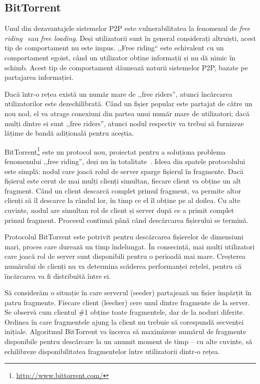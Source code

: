 \subsection{BitTorrent}

Unul din dezavantajele sistemelor P2P este vulnerabilitatea la  fenomenul de
\textit{free riding}~\cite{free-riding} sau \textit{free loading}.
Deși utilizatorii sunt în general considerați altruiști, acest tip de
comportament nu este impus. ,,Free riding`` este echivalent cu un comportament
egoist, când un utilizator obține informații și nu dă nimic în schimb. Acest
tip de comportament dăunează naturii sistemelor P2P, bazate pe partajarea
informației.

Dacă într-o rețea există un număr mare de ,,free riders'', atunci încărcarea
utilizatorilor este dezechilibrată. Când un fișier popular este partajat
de către un nou nod, el va atrage conexiuni din partea unui număr mare de
utilizatori; dacă mulți dintre ei sunt ,,free riders'', atunci nodul respectiv
va trebui să furnizeze lățime de bandă adițională pentru aceștia.

BitTorrent\footnote{\url{http://www.bittorrent.com/}} este un protocol nou,
proiectat pentru a soluționa problema fenomenului ,,free riding'', deși nu
în totalitate~\cite{free-riding}. Ideea din spatele protocolului este simplă:
nodul care joacă rolul de server sparge fișierul în fragmente. Dacă fișierul
este cerut de mai mulți clienți simultan, fiecare client va obține un
alt fragment. Când un client descarcă complet primul fragment, va permite
altor clienți să îl descarce la rândul lor, în timp ce el îl obține pe al
doilea. Cu alte cuvinte, nodul are simultan rol de client și server după ce
a primit complet primul fragment. Procesul continuă până când descărcarea
fișierului se termină.

Protocolul BitTorrent este potrivit pentru descărcarea fișierelor de dimensiuni
mari, proces care durează un timp îndelungat. În consecință, mai mulți
utilizatori care joacă rol de server sunt disponibili pentru o perioadă mai
mare. Creșterea numărului de clienți nu va determina scăderea performanței
rețelei, pentru că încărcarea va fi distribuită între ei.

Să considerăm o situație în care serverul (seeder) partajează un fișier
împărțit în patru fragmente. Fiecare client (leecher) cere unul dintre
fragmente de la server. Se observă cum clientul \#1 obține toate fragmentele,
dar de la noduri diferite. Ordinea în care fragmentele ajung la client nu
trebuie să corespundă secvenței inițiale. Algoritmul BitTorrent va încerca
să maximizeze numărul de fragmente disponibile pentru descărcare la un anumit
moment de timp -- cu alte cuvinte, să echilibreze disponibilitatea fragmentelor
între utilizatorii dintr-o rețea.

